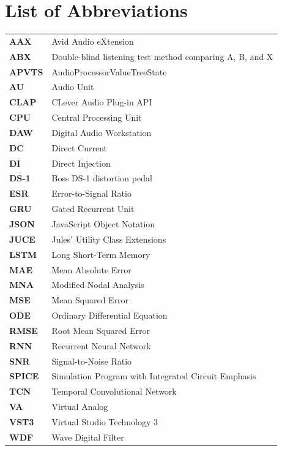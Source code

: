 \chapter*{List of Abbreviations}
\begin{longtable}{>{\bfseries}p{}p{}}
  AAX & Avid Audio eXtension \\
  ABX & Double-blind listening test method comparing A, B, and X \\
  APVTS & AudioProcessorValueTreeState \\
  AU & Audio Unit \\
  CLAP & CLever Audio Plug-in API \\
  CPU & Central Processing Unit \\
  DAW & Digital Audio Workstation \\
  DC & Direct Current \\
  DI & Direct Injection \\
  DS-1 & Boss DS-1 distortion pedal \\
  ESR & Error-to-Signal Ratio \\
  GRU & Gated Recurrent Unit \\
  JSON & JavaScript Object Notation \\
  JUCE & Jules' Utility Class Extensions \\
  LSTM & Long Short-Term Memory \\
  MAE & Mean Absolute Error \\
  MNA & Modified Nodal Analysis \\
  MSE & Mean Squared Error \\
  ODE & Ordinary Differential Equation \\
  RMSE & Root Mean Squared Error \\
  RNN & Recurrent Neural Network \\
  SNR & Signal-to-Noise Ratio \\
  SPICE & Simulation Program with Integrated Circuit Emphasis \\
  TCN & Temporal Convolutional Network \\
  VA & Virtual Analog \\
  VST3 & Virtual Studio Technology 3 \\
  WDF & Wave Digital Filter \\
\end{longtable}
